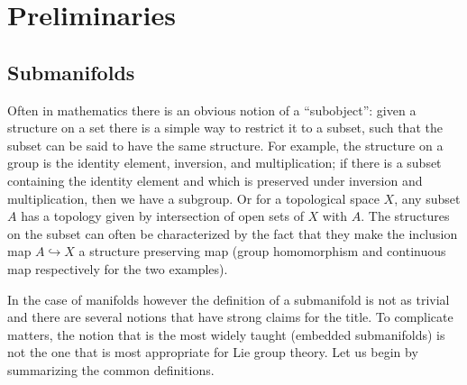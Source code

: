 \chapter{Preliminaries}

\section{Submanifolds}

Often in mathematics there is an obvious notion of a ``subobject'': given a structure on a set there is a simple way to restrict it to a subset, such that the subset can be said to have the same structure.
For example, the structure on a group is the identity element, inversion, and multiplication; if there is a subset containing the identity element and which is preserved under inversion and multiplication, then we have a subgroup.
Or for a topological space $X$, any subset $A$ has a topology given by intersection of open sets of $X$ with $A$.
The structures on the subset can often be characterized by the fact that they make the inclusion map $A \hookrightarrow X$ a structure preserving map (group homomorphism and continuous map respectively for the two examples).

In the case of manifolds however the definition of a submanifold is not as trivial and there are several notions that have strong claims for the title.
To complicate matters, the notion that is the most widely taught (embedded submanifolds) is not the one that is most appropriate for Lie group theory.
Let us begin by summarizing the common definitions.

